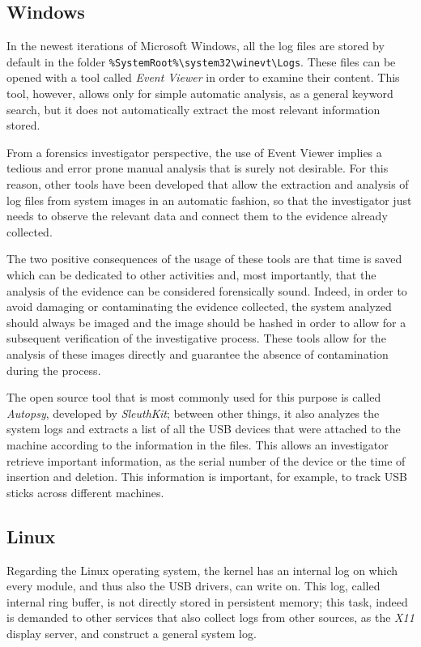 \documentclass[a4paper]{article}
\begin{document}
\subsection{Windows}\label{sec:litWindows}
In the newest iterations of Microsoft Windows, all the log files are stored by
default in the folder
\texttt{\%SystemRoot\%\textbackslash{}system32\textbackslash{}winevt\textbackslash{}Logs}.
These files can be opened with a tool called \emph{Event Viewer} in order to
examine their content. This tool, however, allows only for simple automatic
analysis, as a general keyword search, but it does not automatically extract
the most relevant information stored.

From a forensics investigator perspective, the use of Event Viewer implies a
tedious and error prone manual analysis that is surely not desirable. For this
reason, other tools have been developed that allow the extraction and analysis
of log files from system images in an automatic fashion, so that the
investigator just needs to observe the relevant data and connect them to the
evidence already collected.

The two positive consequences of the usage of these tools are that time is saved
which can be dedicated to other activities and, most importantly, that the
analysis of the evidence can be considered forensically sound. Indeed, in order
to avoid damaging or contaminating the evidence collected, the system analyzed
should always be imaged and the image should be hashed in order to allow for a
subsequent verification of the investigative process. These tools allow for the
analysis of these images directly and guarantee the absence of contamination
during the process.~\cite{murphey2007automated}

The open source tool that is most commonly used for this purpose is called
\emph{Autopsy}, developed by \emph{SleuthKit}; between other things, it also
analyzes the system logs and extracts a list of all the USB devices that were
attached to the machine according to the information in the files. This allows
an investigator retrieve important information, as the serial number of the
device or the time of insertion and deletion. This information is important, for
example, to track USB sticks across different machines.~\cite{deb2015usb}

\subsection{Linux}
Regarding the Linux operating system, the kernel has an internal log on which
every module, and thus also the USB drivers, can write on. This log, called
internal ring buffer, is not directly stored in persistent memory; this task,
indeed is demanded to other services that also collect logs from other sources,
as the \emph{X11} display server, and construct a general system log.
\end{document}
